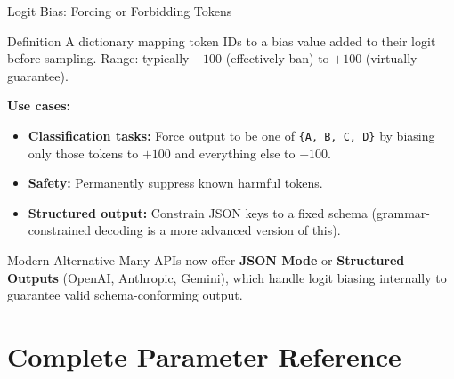 \documentclass{beamer}
\begin{document}
\begin{frame}{Logit Bias: Forcing or Forbidding Tokens}
    \begin{block}{Definition}
        A dictionary mapping token IDs to a bias value added to their logit before sampling.
        Range: typically $-100$ (effectively ban) to $+100$ (virtually guarantee).
    \end{block}

    \vspace{0.2cm}
    \textbf{Use cases:}
    \begin{itemize}
        \item \textbf{Classification tasks:} Force output to be one of \texttt{\{A, B, C, D\}} by
              biasing only those tokens to $+100$ and everything else to $-100$.
        \item \textbf{Safety:} Permanently suppress known harmful tokens.
        \item \textbf{Structured output:} Constrain JSON keys to a fixed schema
              (grammar-constrained decoding is a more advanced version of this).
    \end{itemize}

    \begin{alertblock}{Modern Alternative}
        Many APIs now offer \textbf{JSON Mode} or \textbf{Structured Outputs} (OpenAI, Anthropic, Gemini),
        which handle logit biasing internally to guarantee valid schema-conforming output.
    \end{alertblock}
\end{frame}

\section{Complete Parameter Reference}
\end{document}
